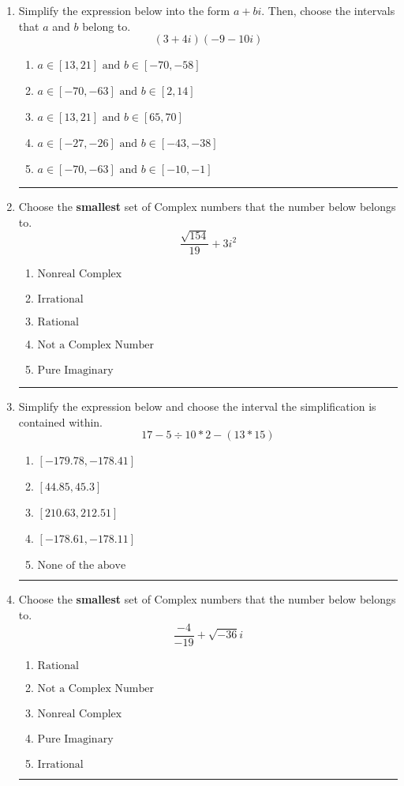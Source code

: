 \documentclass[14pt]{extbook}
\newcommand{\litem}[1]{\item#1\hspace*{-1cm}\rule{\textwidth}{0.4pt}}
\begin{document}
\begin{enumerate}
\litem{
Simplify the expression below into the form $a+bi$. Then, choose the intervals that $a$ and $b$ belong to.\[ (3 + 4 i)(-9 - 10 i) \]\begin{enumerate}[label=\Alph*.]
\item \( a \in [13, 21] \text{ and } b \in [-70, -58] \)
\item \( a \in [-70, -63] \text{ and } b \in [2, 14] \)
\item \( a \in [13, 21] \text{ and } b \in [65, 70] \)
\item \( a \in [-27, -26] \text{ and } b \in [-43, -38] \)
\item \( a \in [-70, -63] \text{ and } b \in [-10, -1] \)

\end{enumerate} }
\litem{
Choose the \textbf{smallest} set of Complex numbers that the number below belongs to.\[ \frac{\sqrt{154}}{19}+3i^2 \]\begin{enumerate}[label=\Alph*.]
\item \( \text{Nonreal Complex} \)
\item \( \text{Irrational} \)
\item \( \text{Rational} \)
\item \( \text{Not a Complex Number} \)
\item \( \text{Pure Imaginary} \)

\end{enumerate} }
\litem{
Simplify the expression below and choose the interval the simplification is contained within.\[ 17 - 5 \div 10 * 2 - (13 * 15) \]\begin{enumerate}[label=\Alph*.]
\item \( [-179.78, -178.41] \)
\item \( [44.85, 45.3] \)
\item \( [210.63, 212.51] \)
\item \( [-178.61, -178.11] \)
\item \( \text{None of the above} \)

\end{enumerate} }
\litem{
Choose the \textbf{smallest} set of Complex numbers that the number below belongs to.\[ \frac{-4}{-19}+\sqrt{-36}i \]\begin{enumerate}[label=\Alph*.]
\item \( \text{Rational} \)
\item \( \text{Not a Complex Number} \)
\item \( \text{Nonreal Complex} \)
\item \( \text{Pure Imaginary} \)
\item \( \text{Irrational} \)


\end{enumerate}}
\end{enumerate}
\end{document}
